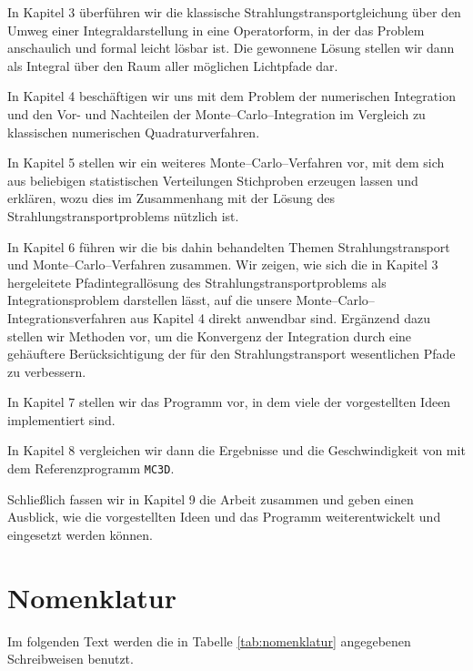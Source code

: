 	In Kapitel 3 überführen wir die klassische Strahlungstransportgleichung über den Umweg einer Integraldarstellung in eine Operatorform, in der das Problem anschaulich und formal leicht lösbar ist. Die gewonnene Lösung stellen wir dann als Integral über den Raum aller möglichen Lichtpfade dar.
	
	In Kapitel 4 beschäftigen wir uns mit dem Problem der numerischen Integration und den Vor- und Nachteilen der Monte--Carlo--Integration im Vergleich zu klassischen numerischen Quadraturverfahren.
	
	In Kapitel 5 stellen wir ein weiteres Monte--Carlo--Verfahren vor, mit dem sich aus beliebigen statistischen Verteilungen Stichproben erzeugen lassen und erklären, wozu dies im Zusammenhang mit der Lösung des Strahlungstransportproblems nützlich ist.
	
	In Kapitel 6 führen wir die bis dahin behandelten Themen Strahlungstransport und Monte--Carlo--Verfahren zusammen. Wir zeigen, wie sich die in Kapitel 3 hergeleitete Pfadintegrallösung des Strahlungstransportproblems als Integrationsproblem darstellen lässt, auf die unsere Monte--Carlo--Integrationsverfahren aus Kapitel 4 direkt anwendbar sind. Ergänzend dazu stellen wir Methoden vor, um die Konvergenz der Integration durch eine gehäuftere Berücksichtigung der für den Strahlungstransport wesentlichen Pfade zu verbessern.
	
	In Kapitel 7 stellen wir das Programm \pirate vor, in dem viele der vorgestellten Ideen implementiert sind.
	
	In Kapitel 8 vergleichen wir dann die Ergebnisse und die Geschwindigkeit von \pirate mit dem Referenzprogramm \texttt{MC3D}.
	
	Schließlich fassen wir in Kapitel 9 die Arbeit zusammen und geben einen Ausblick, wie die vorgestellten Ideen und das Programm \pirate weiterentwickelt und eingesetzt werden können.
	
	\vfill
	\pagebreak
	\section{Nomenklatur}\label{subsec:nomenklatur}
	Im folgenden Text werden die in Tabelle \ref{tab:nomenklatur} angegebenen Schreibweisen benutzt.

